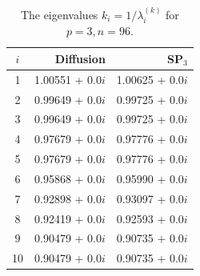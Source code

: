 \documentclass[authoryear]{elsarticle}
\begin{document}
\begin{table}[h]
\caption{The eigenvalues $k_i=1/\lambda_i^{(k)}$ for $p=3, n=96$.}
\label{tab:iaea_with_lambda_10}
\begin{center}
\begin{tabular}{c r r}
\hline
$i$ & Diffusion & SP$_3$  \\
\hline
1 & 1.00551 + 0.0$i$ & 1.00625 + 0.0$i$\\
2 & 0.99649 + 0.0$i$ & 0.99725 + 0.0$i$\\
3 & 0.99649 + 0.0$i$ & 0.99725 + 0.0$i$\\
4 & 0.97679 + 0.0$i$ & 0.97776 + 0.0$i$\\
5 & 0.97679 + 0.0$i$ & 0.97776 + 0.0$i$\\
6 & 0.95868 + 0.0$i$ & 0.95990 + 0.0$i$\\
7 & 0.92898 + 0.0$i$ & 0.93097 + 0.0$i$\\
8 & 0.92419 + 0.0$i$ & 0.92593 + 0.0$i$\\
9 & 0.90479 + 0.0$i$ & 0.90735 + 0.0$i$\\
10 & 0.90479 + 0.0$i$ & 0.90735 + 0.0$i$\\
\hline
\end{tabular}
\end{center}
\end{table}
\end{document}
